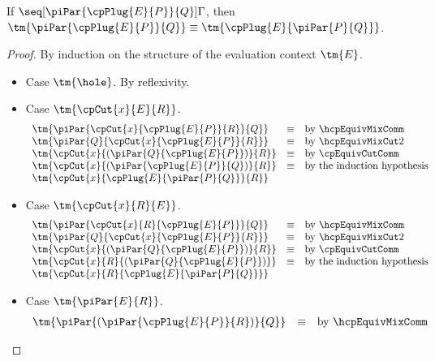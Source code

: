 \begin{lemma}\label{lem:hcp-display-mix}
  If $\seq[{ \piPar{\cpPlug{E}{P}}{Q} }]{ \Gamma }$, then
  $\tm{\piPar{\cpPlug{E}{P}}{Q}} \equiv \tm{\cpPlug{E}{\piPar{P}{Q}}}$. 
\end{lemma}
\begin{proof}
  By induction on the structure of the evaluation context $\tm{E}$.
  \begin{itemize}
  \item
    Case $\tm{\hole}$. By reflexivity.
  \item
    Case $\tm{\cpCut{x}{E}{R}}$.
    \begin{gather*}
      \begin{array}{lcl}
        \tm{\piPar{\cpCut{x}{\cpPlug{E}{P}}{R}}{Q}}     &\equiv &\text{by }\hcpEquivMixComm \\
        \tm{\piPar{Q}{\cpCut{x}{\cpPlug{E}{P}}{R}}}     &\equiv &\text{by }\hcpEquivMixCut2 \\
        \tm{\cpCut{x}{( \piPar{Q}{\cpPlug{E}{P}} )}{R}} &\equiv &\text{by }\cpEquivCutComm \\
        \tm{\cpCut{x}{( \piPar{\cpPlug{E}{P}}{Q} )}{R}} &\equiv &\text{by the induction hypothesis}\\
        \tm{\cpCut{x}{\cpPlug{E}{\piPar{P}{Q}}}{R}}
      \end{array}
    \end{gather*}
  \item
    Case $\tm{\cpCut{x}{R}{E}}$.
    \begin{gather*}
      \begin{array}{lcl}
        \tm{\piPar{\cpCut{x}{R}{\cpPlug{E}{P}}}{Q}}     &\equiv &\text{by }\hcpEquivMixComm \\
        \tm{\piPar{Q}{\cpCut{x}{\cpPlug{E}{P}}{R}}}     &\equiv &\text{by }\hcpEquivMixCut2 \\
        \tm{\cpCut{x}{( \piPar{Q}{\cpPlug{E}{P}} )}{R}} &\equiv &\text{by }\cpEquivCutComm \\
        \tm{\cpCut{x}{R}{( \piPar{Q}{\cpPlug{E}{P}} )}} &\equiv &\text{by the induction hypothesis} \\
        \tm{\cpCut{x}{R}{\cpPlug{E}{\piPar{P}{Q}}}}
      \end{array}
    \end{gather*}
  \item
    Case $\tm{\piPar{E}{R}}$.
    \begin{gather*}
      \begin{array}{lcl}
        \tm{\piPar{( \piPar{\cpPlug{E}{P}}{R} )}{Q}} &\equiv &\text{by }\hcpEquivMixComm \\

\end{array}
\end{gather*}
\end{itemize}
\end{proof}
